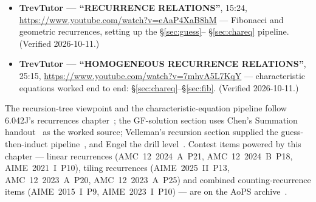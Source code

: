 \begin{rulebox}
\begin{itemize}
\item \textbf{TrevTutor --- ``RECURRENCE RELATIONS''}, 15:24,
\url{https://www.youtube.com/watch?v=eAaP4XaB8hM}
--- Fibonacci and
geometric recurrences, setting up the \S\ref{sec:guess}--%
\S\ref{sec:chareq} pipeline. (Verified 2026-10-11.)
\item \textbf{TrevTutor --- ``HOMOGENEOUS RECURRENCE RELATIONS''}, 25:15,
\url{https://www.youtube.com/watch?v=7mhvA5L7KqY}
--- characteristic
equations worked end to end: \S\ref{sec:chareq}--\S\ref{sec:fib}.
(Verified 2026-10-11.)
\end{itemize}
\end{rulebox}

\chapternotes
The recursion-tree viewpoint and the characteristic-equation pipeline
follow 6.042J's recurrences chapter~\cite{mcs}; the GF-solution section
uses Chen's Summation handout~\cite{chen-summ} as the worked source;
Velleman's recursion section supplied the guess-then-induct
pipeline~\cite{velleman}, and Engel the drill level~\cite{engel}.
Contest items powered by this chapter --- linear recurrences
(AMC~12~2024~A~P21, AMC~12~2024~B~P18, AIME~2021~I~P10), tiling
recurrences (AIME~2025~II~P13, AMC~12~2023~A~P20, AMC~12~2023~A~P25)
and combined counting-recurrence items (AIME~2015~I~P9,
AIME~2023~I~P10) --- are on the AoPS archive~\cite{aops-amc}.
